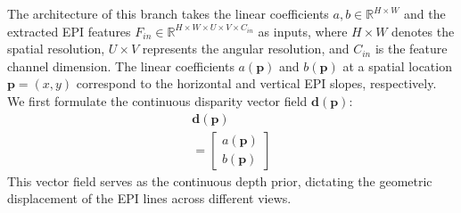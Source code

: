 \documentclass[lettersize,journal]{IEEEtran}
\begin{document}
The architecture of this branch takes the linear coefficients $a, b \in \mathbb{R}^{H \times W}$ and the extracted EPI features $F_{in} \in \mathbb{R}^{H \times W \times U \times V \times C_{in}}$ as inputs, where $H \times W$ denotes the spatial resolution, $U \times V$ represents the angular resolution, and $C_{in}$ is the feature channel dimension. The linear coefficients $a(\mathbf{p})$ and $b(\mathbf{p})$ at a spatial location $\mathbf{p} = (x,y)$ correspond to the horizontal and vertical EPI slopes, respectively. We first formulate the continuous disparity vector field $\mathbf{d}(\mathbf{p})$:
\begin{multline}

\mathbf{d}(\mathbf{p}) \\
= \begin{bmatrix} a(\mathbf{p}) \\ b(\mathbf{p}) \end{bmatrix}
\end{multline}
This vector field serves as the continuous depth prior, dictating the geometric displacement of the EPI lines across different views.
\end{document}
